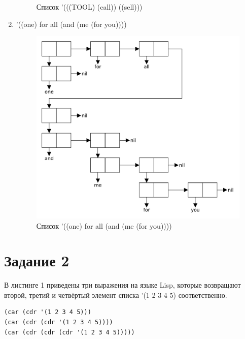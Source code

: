 \begin{enumerate}
\begin{figure}[H]
            \caption{Список '(((TOOL) (call)) ((sell)))}
        \end{figure}
    \item '((one) for all (and (me (for you))))
        \begin{figure}[H]
            \centering
            \includegraphics[scale=0.75]{data/pdf/01-06.pdf}
            \caption{Список '((one) for all (and (me (for you))))}
        \end{figure}
\end{enumerate}

\section{Задание \No{}2}

В листинге 1 приведены три выражения на языке Lisp, которые возвращают второй, третий и четвёртый элемент списка '(1 2 3 4 5) соответственно.

\lstset{language=lisp}
\begin{lstlisting}[caption={Выражения, возвращающие 2, 3 и 4 элементы списка}]
(car (cdr '(1 2 3 4 5)))
(car (cdr (cdr '(1 2 3 4 5))))
(car (cdr (cdr (cdr '(1 2 3 4 5)))))
\end{lstlisting}

